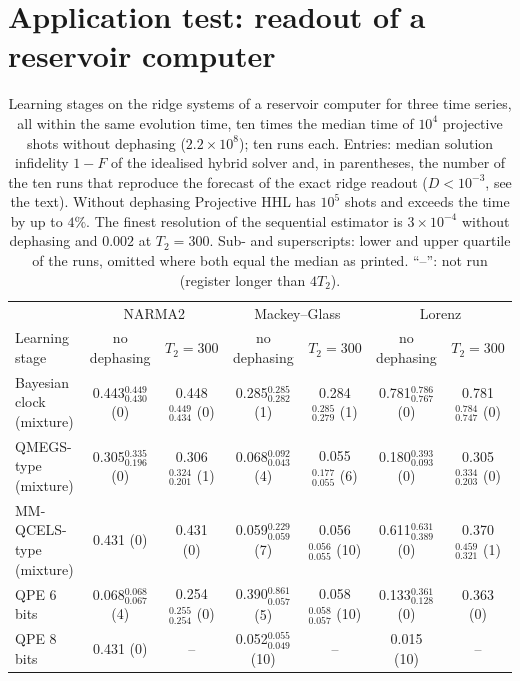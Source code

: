 \documentclass[journal]{IEEEtran}
\begin{document}
\section{Application test: readout of a reservoir computer}
\label{sec:series}

\begin{table}[t]
\caption{Learning stages on the ridge systems of a reservoir computer for three time series, all within the same evolution time, ten times the median time of $10^4$ projective shots without dephasing ($2.2\times10^8$); ten runs each. Entries: median solution infidelity $1-F$ of the idealised hybrid solver and, in parentheses, the number of the ten runs that reproduce the forecast of the exact ridge readout ($D<10^{-3}$, see the text). Without dephasing Projective HHL has $10^5$ shots and exceeds the time by up to $4\%$. The finest resolution of the sequential estimator is $3\times10^{-4}$ without dephasing and $0.002$ at $T_2=300$. Sub- and superscripts: lower and upper quartile of the runs, omitted where both equal the median as printed. ``--'': not run (register longer than $4T_2$).}
\label{tab:series}
\centering\footnotesize\renewcommand{\arraystretch}{1.3}
\setlength{\tabcolsep}{2.7pt}
\begin{tabular}{lcccccc}
\toprule
 & \multicolumn{2}{c}{NARMA2} & \multicolumn{2}{c}{Mackey--Glass} & \multicolumn{2}{c}{Lorenz}\\
Learning stage & no dephasing & $T_2=300$ & no dephasing & $T_2=300$ & no dephasing & $T_2=300$\\
\midrule
Bayesian clock (mixture) & 0.443$_{0.430}^{0.449}$ (0) & 0.448$_{0.434}^{0.449}$ (0) & 0.285$_{0.282}^{0.285}$ (1) & 0.284$_{0.279}^{0.285}$ (1) & 0.781$_{0.767}^{0.786}$ (0) & 0.781$_{0.747}^{0.784}$ (0)\\
QMEGS-type (mixture) & 0.305$_{0.196}^{0.335}$ (0) & 0.306$_{0.201}^{0.324}$ (1) & 0.068$_{0.043}^{0.092}$ (4) & 0.055$_{0.055}^{0.177}$ (6) & 0.180$_{0.093}^{0.393}$ (0) & 0.305$_{0.203}^{0.334}$ (0)\\
MM-QCELS-type (mixture) & 0.431 (0) & 0.431 (0) & 0.059$_{0.059}^{0.229}$ (7) & 0.056$_{0.055}^{0.056}$ (10) & 0.611$_{0.389}^{0.631}$ (0) & 0.370$_{0.321}^{0.459}$ (1)\\
QPE 6 bits & 0.068$_{0.067}^{0.068}$ (4) & 0.254$_{0.254}^{0.255}$ (0) & 0.390$_{0.057}^{0.861}$ (5) & 0.058$_{0.057}^{0.058}$ (10) & 0.133$_{0.128}^{0.361}$ (0) & 0.363 (0)\\
QPE 8 bits & 0.431 (0) & -- & 0.052$_{0.049}^{0.055}$ (10) & -- & 0.015 (10) & --\\

\end{tabular}
\end{table}
\end{document}
